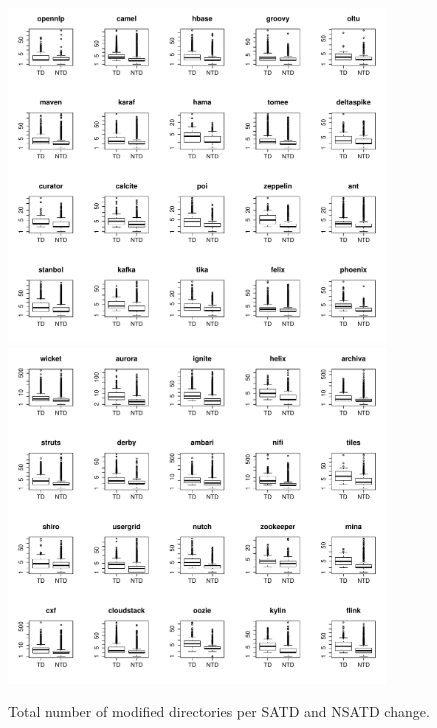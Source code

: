 \begin{figure}[tb]
	\centering
	\includegraphics[width=100mm]{figures/chapter4/rq3_td_nd_logged_1}
	\includegraphics[width=100mm]{figures/chapter4/rq3_td_nd_logged_2}
	\caption{Total number of modified directories per SATD and NSATD change.}
	\label{figure:total_nd_changed_td_vs_ntd}
\end{figure}




